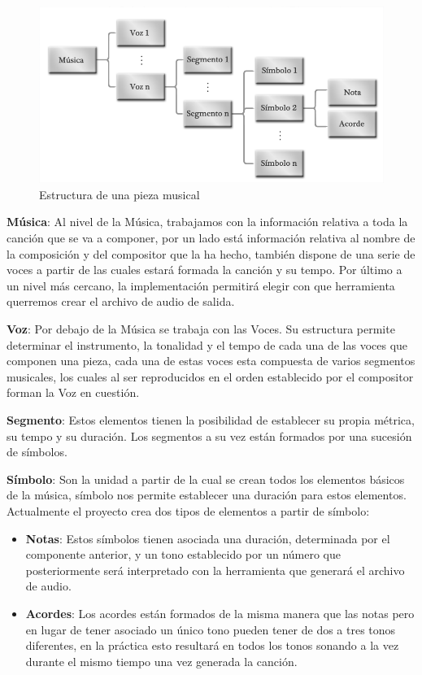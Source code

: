 	\begin{figure}[htbp]
	\centering
	\hspace*{-0.1in}
	\includegraphics[scale=0.47]{graphics/musica-estructura.png}
	\caption{Estructura de una pieza musical}
	\label{fig:structmusic}
	\end{figure}


\textbf{Música}: Al nivel de la Música, trabajamos con la información relativa a toda la canción que se va a componer, por un lado está información relativa al nombre de la composición y del compositor que la ha hecho, también dispone de una serie de voces a partir de las cuales estará formada la canción y su tempo. Por último a un nivel más cercano, la implementación permitirá elegir con que herramienta querremos crear el archivo de audio de salida.
\newline

\textbf{Voz}: Por debajo de la Música se trabaja con las Voces. Su estructura permite determinar el instrumento, la tonalidad y el tempo de cada una de las voces que componen una pieza, cada una de estas voces esta compuesta de varios segmentos musicales, los cuales al ser reproducidos en el orden establecido por el compositor forman la Voz en cuestión.
\newline

\textbf{Segmento}: Estos elementos tienen la posibilidad de establecer su propia métrica, su tempo y su duración. Los segmentos a su vez están formados por una sucesión de símbolos.
\newline

\textbf{Símbolo}: Son la unidad a partir de la cual se crean todos los elementos básicos de la música, símbolo nos permite establecer una duración para estos elementos. Actualmente el proyecto crea dos tipos de elementos a partir de símbolo:
\begin{itemize}
\item \textbf{Notas}: Estos símbolos tienen asociada una duración, determinada por el componente anterior, y un tono establecido por un número que posteriormente será interpretado con la herramienta que generará el archivo de audio.
\item \textbf{Acordes}: Los acordes están formados de la misma manera que las notas pero en lugar de tener asociado un único tono pueden tener de dos a tres tonos diferentes, en la práctica esto resultará en todos los tonos sonando a la vez durante el mismo tiempo una vez generada la canción.
\end{itemize}
 
